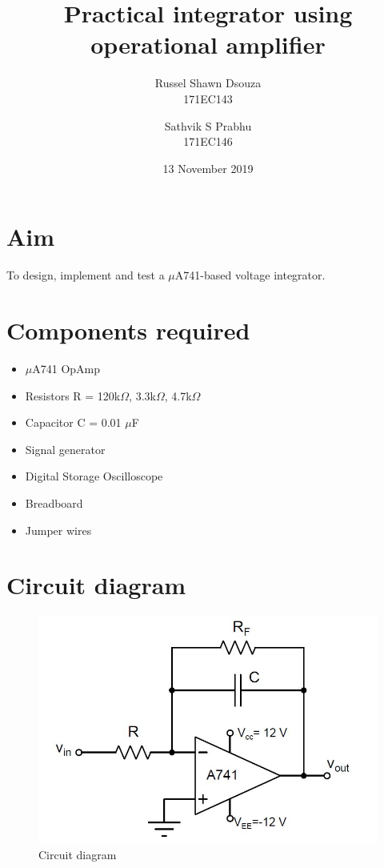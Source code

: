 \documentclass[12pt, titlepage]{article}
\title{\textbf{Practical integrator using operational amplifier}}
\author{
  Russel Shawn Dsouza\\
  171EC143
  \and
  Sathvik S Prabhu\\
  171EC146
}
\date{13 November 2019}
\theoremstyle{definition}
\begin{document}
  \maketitle
  \thispagestyle{empty}

  \newpage
  \tableofcontents
  \thispagestyle{empty}

  \newpage
  \setcounter{page}{1}
  \section{Aim}
  To design, implement and test a $\mu$A741-based voltage integrator.


  \section*{Components required}
    \begin{itemize}
      \item $\mu$A741 OpAmp
      \item Resistors R = 120k$\Omega$, 3.3k$\Omega$, 4.7k$\Omega$
      \item Capacitor C = 0.01 $\mu$F
      \item Signal generator
      \item Digital Storage Oscilloscope
      \item Breadboard
      \item Jumper wires
    \end{itemize}


  \section*{Circuit diagram}
    \begin{figure}
      \includegraphics[scale=0.5]{circuit}
      \caption{Circuit diagram}
      \label{fig:theoretical_circuit}
    \end{figure}
\end{document}
